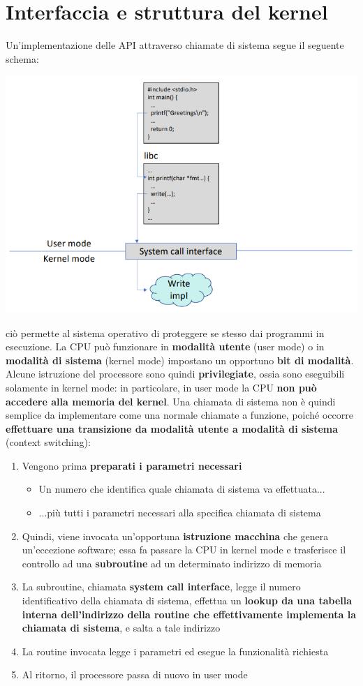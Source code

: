 \documentclass[12pt]{article}
\begin{document}
\section{Interfaccia e struttura del kernel}
Un'implementazione delle API attraverso chiamate di sistema segue il seguente schema:
\begin{center}
    \includegraphics[width = 0.80\linewidth]{Images/33.png}
\end{center}
ciò permette al sistema operativo di proteggere se stesso dai programmi in esecuzione.
La CPU può funzionare in \textbf{modalità utente} (user mode) o in \textbf{modalità di sistema} (kernel mode) impostano un opportuno \textbf{bit di modalità}.
Alcune istruzione del processore sono quindi \textbf{privilegiate}, ossia sono eseguibili solamente in kernel mode: in particolare, in user mode la CPU \textbf{non può accedere alla memoria del kernel}.
Una chiamata di sistema non è quindi semplice da implementare come una normale chiamate a funzione, poiché occorre \textbf{effettuare una transizione da modalità utente a modalità di sistema} (context switching):
\begin{enumerate}
    \item Vengono prima \textbf{preparati i parametri necessari}
    \begin{itemize}
        \item Un numero che identifica quale chiamata di sistema va effettuata...
        \item ...più tutti i parametri necessari alla specifica chiamata di sistema
    \end{itemize}
    \item Quindi, viene invocata un'opportuna \textbf{istruzione macchina} che genera un'eccezione software; essa fa passare la CPU in kernel mode e trasferisce il controllo ad una \textbf{subroutine} ad un determinato indirizzo di memoria
    \item La subroutine, chiamata \textbf{system call interface}, legge il numero identificativo della chiamata di sistema, effettua un \textbf{lookup da una tabella interna dell'indirizzo della routine che effettivamente implementa la chiamata di sistema}, e salta a tale indirizzo
    \item La routine invocata legge i parametri ed esegue la funzionalità richiesta
    \item Al ritorno, il processore passa di nuovo in user mode
\end{enumerate}
\end{document}
